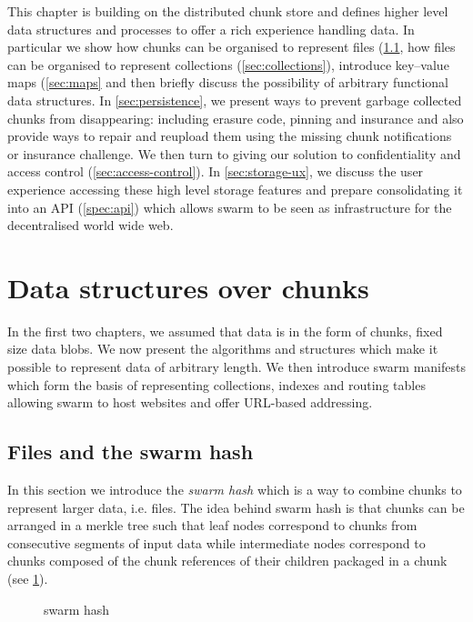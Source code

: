 This chapter is building on the distributed chunk store and defines higher level data structures and
processes to offer a rich experience handling data. In particular we show how chunks can be organised to represent files (\ref{sec:files}, how files can be organised to represent collections (\ref{sec:collections}), introduce key--value maps (\ref{sec:maps} and then briefly discuss the possibility of arbitrary functional data structures. In \ref{sec:persistence}, we present ways to prevent garbage collected chunks from disappearing: including erasure code, pinning and insurance and also provide ways to repair and reupload them using the missing chunk notifications or insurance challenge. We then turn to giving our solution to confidentiality and access control (\ref{sec:access-control}). In \ref{sec:storage-ux}, we discuss the user experience accessing these high level storage features and prepare consolidating it into an API (\ref{spec:api}) which allows swarm to be seen as infrastructure for the decentralised world wide web. 

\section{Data structures over chunks}\label{sec:datastructures}

In the first two chapters, we assumed that data is in the form of chunks, fixed size data blobs. We now present the algorithms and structures which make it possible to represent data of arbitrary length. We then introduce swarm manifests which form the basis of representing  collections, indexes and routing tables allowing swarm to host websites and offer URL-based addressing.

\subsection{Files and the swarm hash}\label{sec:files}

In this section we introduce the \emph{swarm hash} which is a way to combine chunks to represent larger data, i.e. files. The idea behind swarm hash is that chunks can be arranged in a merkle tree such that leaf nodes correspond to chunks from consecutive segments of input data while intermediate nodes correspond to chunks composed of the chunk references of their children packaged in a chunk (see \ref{fig:swarm-hash}). 



\begin{figure}[htbp]
\centering

\caption{swarm hash}
\label{fig:swarm-hash}
\end{figure}

